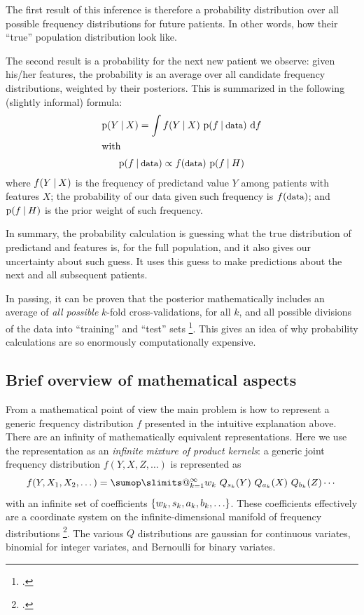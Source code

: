\documentclass[\ifafour a4paper,12pt,\else a5paper,10pt,\fi%
onecolumn,oneside,article,%
british%
]{memoir}
\makeatletter
\theoremstyle{remark}
\theoremstyle{innote}
\def\sum{\DOTSI\sumop\slimits@}
\newcommand*{\citep}{\footcites}
\newcommand*{\di}{\mathrm{d}}%
\DeclarePairedDelimiter\set{\{}{\}} %
\newcommand*{\p}{\mathrm{p}}%
\renewcommand*{\|}[1][]{\nonscript\:#1\vert\nonscript\:\mathopen{}}
\makeatother
\begin{document}
The first result of this inference is therefore a probability distribution
over all possible frequency distributions for future patients. In other
words, how their \enquote{true} population distribution look like.

The second result is a probability for the next new patient we observe:
given his/her features, the probability is an average over all candidate
frequency distributions, weighted by their posteriors. This is summarized
in the following (slightly informal) formula:
\begin{subequations}  \label{eq:definetti}
  \begin{gather}
    \p(Y \|X) =    \int f(Y \| X) \ \p(f \| \textrm{\small data})\ \di f
    \\
    \shortintertext{with}
    \p(f \| \textrm{\small data}) \propto
    f(\textrm{\small data})\ \p(f \| H)
  \end{gather}
\end{subequations}
where $f(Y\|X)$ is the frequency of predictand value $Y$ among patients
with features $X$; the probability of our data given such frequency is
$f(\textrm{\small data})$; and $\p(f \| H)$ is the prior weight of such
frequency.


In summary, the probability calculation is guessing what the true
distribution of predictand and features is, for the full population, and it
also gives our uncertainty about such guess. It uses this guess to make
predictions about the next and all subsequent patients.

In passing, it can be proven that the posterior mathematically includes an
average of \emph{all possible} $k$-fold cross-validations, for all $k$, and
all possible divisions of the data into \enquote{training} and
\enquote{test} sets \citep{portamana2019b}. This gives an idea of why
probability calculations are so enormously computationally expensive.

\subsection{Brief overview of mathematical aspects}
\label{sec:maths}

From a mathematical point of view the main problem is how to represent a
generic frequency distribution $f$ presented in the intuitive explanation
above. There are an infinity of mathematically equivalent representations.
Here we use the representation as an \emph{infinite mixture of product
  kernels}: a generic joint frequency distribution $f(Y, X, Z, \dotsc)$ is
represented as
\begin{equation}
  \label{eq:freq_repr}
  f(Y, X_{1}, X_{2}, \dotsc) =
  \sum_{k=1}^{\infty} w_{k}\ Q_{s_{k}}(Y)\ Q_{a_{k}}(X)\ Q_{b_{k}}(Z) \dotsm
\end{equation}
with an infinite set of coefficients
$\set{w_{k},s_{k},a_{k},b_{k},\dotsc}$. These coefficients effectively are
a coordinate system on the infinite-dimensional manifold of frequency
distributions \citep[esp.\ Part~VII]{choquetbruhatetal1977_r1996}. The
various $Q$ distributions are gaussian for continuous variates, binomial
for integer variates, and Bernoulli for binary variates.
\end{document}
